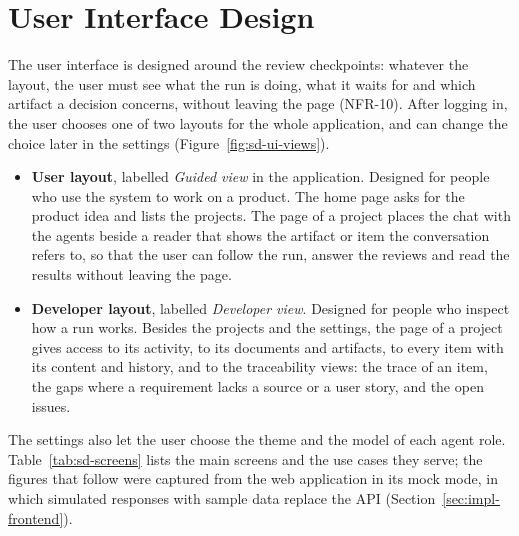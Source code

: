 \section{User Interface Design}
\label{sec:sd-ui}

The user interface is designed around the review checkpoints: whatever the layout, the user must see what the run is doing, what it waits for and which artifact a decision concerns, without leaving the page (NFR-10). After logging in, the user chooses one of two layouts for the whole application, and can change the choice later in the settings (Figure~\ref{fig:sd-ui-views}).
\begin{itemize}
    \item \textbf{User layout}, labelled \emph{Guided view} in the application. Designed for people who use the system to work on a product. The home page asks for the product idea and lists the projects. The page of a project places the chat with the agents beside a reader that shows the artifact or item the conversation refers to, so that the user can follow the run, answer the reviews and read the results without leaving the page.
    \item \textbf{Developer layout}, labelled \emph{Developer view}. Designed for people who inspect how a run works. Besides the projects and the settings, the page of a project gives access to its activity, to its documents and artifacts, to every item with its content and history, and to the traceability views: the trace of an item, the gaps where a requirement lacks a source or a user story, and the open issues.
\end{itemize}
The settings also let the user choose the theme and the model of each agent role. Table~\ref{tab:sd-screens} lists the main screens and the use cases they serve; the figures that follow were captured from the web application in its mock mode, in which simulated responses with sample data replace the API (Section~\ref{sec:impl-frontend}).

